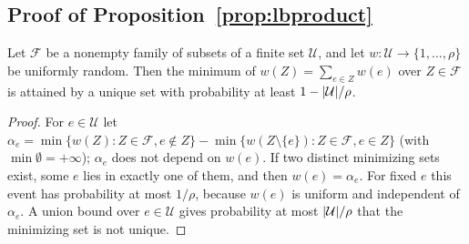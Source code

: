 \subsection{Proof of Proposition~\ref{prop:lbproduct}}\label{app:lbproduct}

\begin{lemma}\label{lem:isolation}
Let $\mathcal F$ be a nonempty family of subsets of a finite set $\mathcal U$,
and let $w:\mathcal U\to\{1,\dots,\rho\}$ be uniformly random. Then the minimum
of $w(Z)=\sum_{e\in Z}w(e)$ over $Z\in\mathcal F$ is attained by a unique set
with probability at least $1-\lvert \mathcal U\rvert/\rho$.
\end{lemma}

\begin{proof}
For $e\in\mathcal U$ let $\alpha_e=\min\{w(Z):Z\in\mathcal F,e\notin Z\}
-\min\{w(Z\setminus\{e\}):Z\in\mathcal F,e\in Z\}$ (with
$\min\emptyset=+\infty$); $\alpha_e$ does not depend on $w(e)$. If two
distinct minimizing sets exist, some $e$ lies in exactly one of them, and
then $w(e)=\alpha_e$. For fixed $e$ this event has probability at most
$1/\rho$, because $w(e)$ is uniform and independent of $\alpha_e$. A union
bound over $e\in\mathcal U$ gives probability at most $\lvert \mathcal U\rvert/\rho$
that the minimizing set is not unique.
\end{proof}

